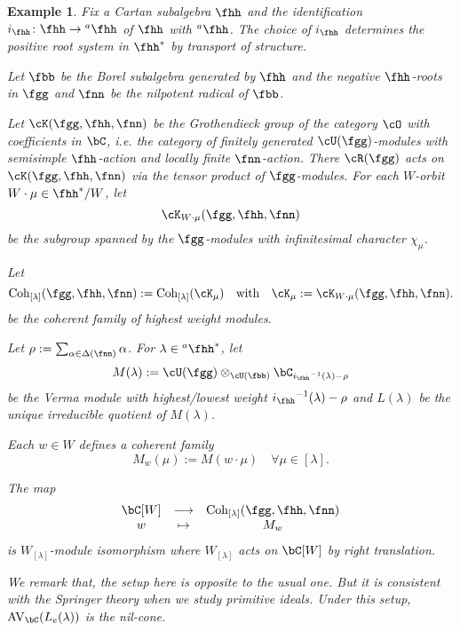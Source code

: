 \documentclass[12pt,a4paper]{amsart}
\newcommand{\AVC}{\mathrm{AV}_\bC}
\numberwithin{equation}{section}
\newtheorem{eg}[thm]{Example}
\theoremstyle{remark}
\def\ihh{{i_\fhh}}
\def\hha{{}^a\fhh}
\def\ahh{\hha}
\def\WT#1{\Delta(#1)}
\def\Coh{\mathrm{Coh}}
\newcommand{\Rg}{\cR(\fgg)}
\newcommand{\Grt}{\cK}
\begin{document}
\begin{eg}\label{eg:hw}
  Fix a Cartan subalgebra $\fhh$ and the identification
  $\ihh\colon \fhh\rightarrow \ahh $ of $\fhh$ with $\ahh$. The choice of $\ihh$
  determines the positive root system in $\fhh^{*}$ by transport of structure.

  Let $\fbb$ be the Borel subalgebra generated by $\fhh$ and the negative
  $\fhh$-roots in $\fgg$ and $\fnn$ be the nilpotent radical of $\fbb$.

  Let $\Grt(\fgg,\fhh,\fnn)$ be the Grothendieck group of the category $\cO$
  with coefficients in $\bC$, i.e. the category of finitely generated
  $\cU(\fgg)$-modules with semisimple $\fhh$-action and locally finite
  $\fnn$-action. There $\Rg$ acts on $\Grt(\fgg,\fhh,\fnn)$ via the tensor
  product of $\fgg$-modules. For each $W$-orbit $W\cdot \mu\in \fhh^{*}/W$, let
  \[
    \Grt_{W\cdot \mu}(\fgg,\fhh,\fnn)
  \]
  be the subgroup spanned by the $\fgg$-modules with infinitesimal character
  $\chi_{\mu}$.

  Let
  \[
    \Coh_{[\lambda]}(\fgg,\fhh,\fnn) := \Coh_{[\lambda]}(\cK_{\mu}) \quad \text{with} \quad \cK_{\mu} := \Grt_{W\cdot \mu}(\fgg,\fhh,\fnn).
  \]
  be the coherent family of highest weight modules.


  Let $\rho := \sum_{\alpha\in \WT{\fnn}} \alpha$. For $\lambda\in \ahh^{*}$,
  let
  \[
    M(\lambda) := \cU(\fgg)\otimes_{\cU(\fbb)} \bC_{\ihh^{-1}(\lambda)-\rho}
  \]
  be the Verma module with highest/lowest weight $\ihh^{-1}(\lambda)-\rho$ and
  $L(\lambda) $ be the unique irreducible quotient of $M(\lambda)$.

  Each $w\in W$ defines a coherent family %
  \[
    M_w(\mu) := M(w\cdot \mu) \quad \forall \mu \in [\lambda].
  \]

  The map
  \[
    \begin{array}{ccc}
      \bC[W] & \longrightarrow & \Coh_{[\lambda]}(\fgg,\fhh,\fnn)  \\
      w& \mapsto &M_{w}
    \end{array}
  \]
  is $W_{[\lambda]}$-module isomorphism where $W_{[\lambda]}$ acts on $\bC[W]$
  by right translation.


  We remark that, the setup here is opposite to the usual one. But it is
  consistent with the Springer theory when we study primitive ideals. Under this
  setup, $\AVC(L_{e}(\lambda))$ is the nil-cone.


\end{eg}
\end{document}
